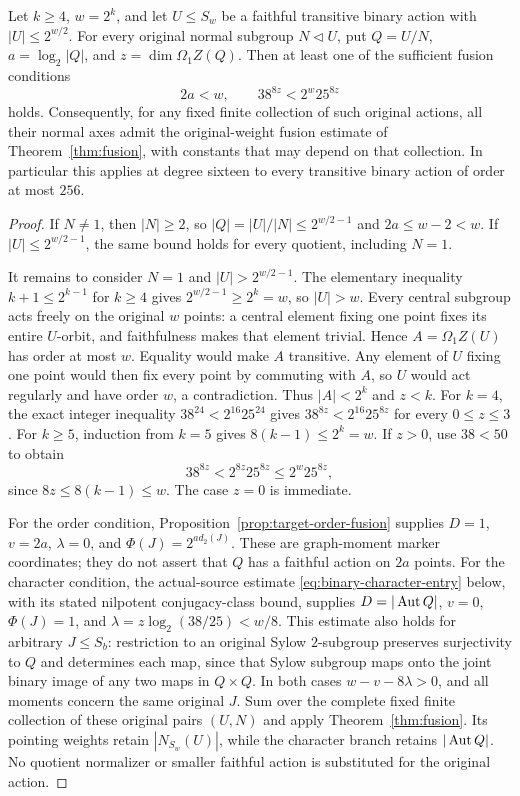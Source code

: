 \begin{lemma}
\label{lem:binary-sixteen-order-stop}
Let $k\geq4$, $w=2^k$, and let $U\leq S_w$ be a faithful
transitive binary action with $|U|\leq2^{w/2}$.
For every original normal subgroup $N\lhd U$, put
$Q=U/N$, $a=\log_2|Q|$, and $z=\dim\Omega_1Z(Q)$. Then at least
one of the sufficient fusion conditions
\[
 2a<w,\qquad 38^{8z}<2^w25^{8z}
\]
holds. Consequently, for any fixed finite collection of such original
actions, all their normal axes admit the original-weight fusion
estimate of Theorem~\ref{thm:fusion}, with constants that may depend
on that collection. In particular this applies at degree sixteen
to every transitive binary action of order at most $256$.
\end{lemma}
\begin{proof}
If $N\ne1$, then $|N|\geq2$, so
$|Q|=|U|/|N|\leq2^{w/2-1}$ and $2a\leq w-2<w$.
If $|U|\leq2^{w/2-1}$, the same bound holds for every quotient,
including $N=1$.

It remains to consider $N=1$ and $|U|>2^{w/2-1}$. The elementary
inequality $k+1\leq2^{k-1}$ for $k\geq4$ gives
$2^{w/2-1}\geq2^k=w$, so $|U|>w$.
Every central subgroup acts freely on the original $w$ points: a central
element fixing one point fixes its entire $U$-orbit, and faithfulness
makes that element trivial. Hence $A=\Omega_1Z(U)$ has order at most
$w$. Equality would make $A$ transitive. Any element of $U$ fixing
one point would then fix every point by commuting with $A$, so $U$
would act regularly and have order $w$, a contradiction. Thus
$|A|<2^k$ and $z<k$.
For $k=4$, the exact integer inequality
$38^{24}<2^{16}25^{24}$ gives
$38^{8z}<2^{16}25^{8z}$ for every $0\leq z\leq3$.
For $k\geq5$, induction from $k=5$ gives $8(k-1)\leq2^k=w$.
If $z>0$, use $38<50$ to obtain
\[
 38^{8z}<2^{8z}25^{8z}\leq2^w25^{8z},
\]
since $8z\leq8(k-1)\leq w$. The case $z=0$ is immediate.

For the order condition, Proposition~\ref{prop:target-order-fusion}
supplies $D=1$, $v=2a$, $\lambda=0$, and
$\Phi(J)=2^{a d_2(J)}$. These are graph-moment marker coordinates;
they do not assert that $Q$ has a faithful action on $2a$ points.
For the character condition, the actual-source estimate
\eqref{eq:binary-character-entry} below, with its stated nilpotent
conjugacy-class bound, supplies
$D=|\operatorname{Aut} Q|$, $v=0$, $\Phi(J)=1$, and
$\lambda=z\log_2(38/25)<w/8$. This estimate also holds for arbitrary
$J\leq S_b$: restriction to an original Sylow $2$-subgroup preserves
surjectivity to $Q$ and determines each map, since that Sylow subgroup
maps onto the joint binary image of any two maps in $Q\times Q$.
In both cases
$w-v-8\lambda>0$, and all moments concern the same original $J$.
Sum over the complete fixed finite collection of these original
pairs $(U,N)$ and apply Theorem~\ref{thm:fusion}. Its pointing
weights retain $|N_{S_w}(U)|$, while the character branch retains
$|\operatorname{Aut} Q|$. No quotient normalizer or smaller faithful action is
substituted for the original action.
\end{proof}

